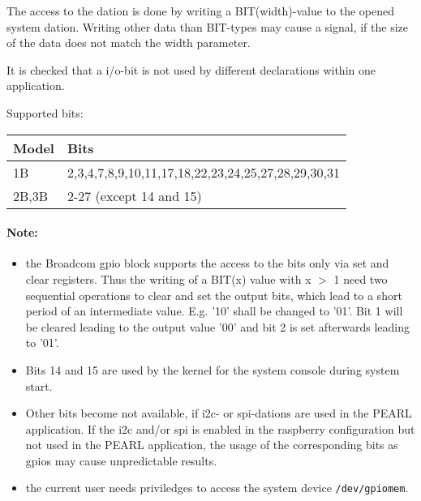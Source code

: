 The access to the dation is done by writing a BIT(width)-value to the
opened system dation. 
Writing other data than BIT-types  may cause a signal, if the size of the
data does not match the width parameter. 

It is checked that a i/o-bit is not used by different declarations within
one application.

Supported bits:

\begin{tabular}{|l|l|}
\hline
Model & Bits \\
\hline
1B & 2,3,4,7,8,9,10,11,17,18,22,23,24,25,27,28,29,30,31 \\
\hline
2B,3B & 2-27 (except 14 and 15) \\
\hline
\end{tabular}  

\paragraph{Note:} 
\begin{itemize}
\item the Broadcom gpio block supports the access to the bits only 
via set and clear registers. Thus the writing of a BIT(x) value with x $>$ 1
need two sequential operations to clear and set the output bits, which lead
to a short period of an intermediate value. E.g. '10' shall be changed to '01'. Bit 1 will be cleared leading to the output value '00' and bit 2 
is set afterwards leading to '01'.

\item Bits 14 and 15 are used by the kernel for the 
  system console during system start.
\item Other bits become not available, if i2c- or spi-dations are used
  in the PEARL application.  If the i2c and/or spi is enabled in the
  raspberry configuration but not used in the PEARL application,
  the usage of the corresponding bits 
  as gpios may cause unpredictable results.
\item the current user needs priviledges to access the system device 
  \verb|/dev/gpiomem|.
\end{itemize}
  
